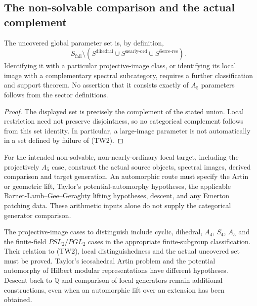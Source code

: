 \subsection{The non-solvable comparison and the actual complement}
\begin{corollary}
\label{v4-arith:w6-e:cor:TW-removal-uncond}
The uncovered global parameter set is, by definition,
\[
 S_{\mathrm{fail}}\setminus
 (S^{\mathrm{dihedral}}\cup S^{\mathrm{nearly\text{-}ord}}
       \cup S^{\mathrm{Serre\text{-}res}}).
\]
Identifying it with a particular projective-image class, or identifying
its local image with a complementary spectral subcategory, requires
a further classification and support theorem. No assertion that it
consists exactly of $A_5$ parameters follows from the sector definitions.
\end{corollary}
\begin{proof}
The displayed set is precisely the complement of the stated union.
Local restriction need not preserve disjointness, so no categorical
complement follows from this set identity. In particular, a large-image
parameter is not automatically in a set defined by failure of (TW2).
\end{proof}
\begin{conjecture}
\label{v4-arith:w6-e:conj:TW-removal-ns-residual}
For the intended non-solvable, non-nearly-ordinary local target,
including the projectively $A_5$ case, construct the actual source
objects, spectral images, derived comparison and target generation.
An automorphic route must specify the Artin or geometric lift,
Taylor's potential-automorphy hypotheses, the applicable
Barnet-Lamb--Gee--Geraghty lifting hypotheses, descent, and any Emerton
patching data. These arithmetic inputs alone do not supply the
categorical generator comparison.
\end{conjecture}
\begin{remark}
\label{v4-arith:w6-e:rem:ns-residual-domain}
The projective-image cases to distinguish include cyclic, dihedral,
$A_4$, $S_4$, $A_5$ and the finite-field $PSL_2/PGL_2$ cases in the
appropriate finite-subgroup classification. Their relation to (TW2),
local distinguishedness and the actual uncovered set must be proved.
Taylor's icosahedral Artin problem and the potential automorphy of
Hilbert modular representations have different hypotheses. Descent
back to $\mathbb Q$ and comparison of local generators remain
additional constructions, even when an automorphic lift over an
extension has been obtained.
\end{remark}

